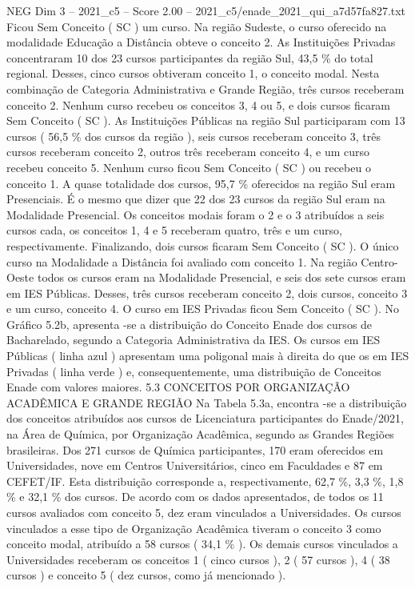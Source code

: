 \begin{textsample}{NEG Dim 3 – 2021\_c5 – Score 2.00 – 2021\_c5/enade\_2021\_qui\_a7d57fa827.txt}
Ficou Sem Conceito ( SC ) um curso.
Na região Sudeste, o curso oferecido na modalidade Educação a Distância obteve o conceito 2.
As Instituições Privadas concentraram 10 dos 23 cursos participantes da região Sul, 43,5 \% do total regional.
Desses, cinco cursos obtiveram conceito 1, o conceito modal.
Nesta combinação de Categoria Administrativa e Grande Região, três cursos receberam conceito 2.
Nenhum curso recebeu os conceitos 3, 4 ou 5, e dois cursos ficaram Sem Conceito ( SC ).
As Instituições Públicas na região Sul participaram com 13 cursos ( 56,5 \% dos cursos da região ), seis cursos receberam conceito 3, três cursos receberam conceito 2, outros três receberam conceito 4, e um curso recebeu conceito 5.
Nenhum curso ficou Sem Conceito ( SC ) ou recebeu o conceito 1.
A quase totalidade dos cursos, 95,7 \% oferecidos na região Sul eram Presenciais.
É o mesmo que dizer que 22 dos 23 cursos da região Sul eram na Modalidade Presencial.
Os conceitos modais foram o 2 e o 3 atribuídos a seis cursos cada, os conceitos 1, 4 e 5 receberam quatro, três e um curso, respectivamente.
Finalizando, dois cursos ficaram Sem Conceito ( SC ).
O único curso na Modalidade a Distância foi avaliado com conceito 1.
Na região Centro-Oeste todos os cursos eram na Modalidade Presencial, e seis dos sete cursos eram em IES Públicas.
Desses, três cursos receberam conceito 2, dois cursos, conceito 3 e um curso, conceito 4.
O curso em IES Privadas ficou Sem Conceito ( SC ).
No Gráfico 5.2b, apresenta -se a distribuição do Conceito Enade dos cursos de Bacharelado, segundo a Categoria Administrativa da IES.
Os cursos em IES Públicas ( linha azul ) apresentam uma poligonal mais à direita do que os em IES Privadas ( linha verde ) e, consequentemente, uma distribuição de Conceitos Enade com valores maiores. 5.3 CONCEITOS POR ORGANIZAÇÃO ACADÊMICA E GRANDE REGIÃO Na Tabela 5.3a, encontra -se a distribuição dos conceitos atribuídos aos cursos de Licenciatura participantes do Enade/2021, na Área de Química, por Organização Acadêmica, segundo as Grandes Regiões brasileiras.
Dos 271 cursos de Química participantes, 170 eram oferecidos em Universidades, nove em Centros Universitários, cinco em Faculdades e 87 em CEFET/IF.
Esta distribuição corresponde a, respectivamente, 62,7 \%, 3,3 \%, 1,8 \% e 32,1 \% dos cursos.
De acordo com os dados apresentados, de todos os 11 cursos avaliados com conceito 5, dez eram vinculados a Universidades.
Os cursos vinculados a esse tipo de Organização Acadêmica tiveram o conceito 3 como conceito modal, atribuído a 58 cursos ( 34,1 \% ).
Os demais cursos vinculados a Universidades receberam os conceitos 1 ( cinco cursos ), 2 ( 57 cursos ), 4 ( 38 cursos ) e conceito 5 ( dez cursos, como já mencionado ).

\end{textsample}
